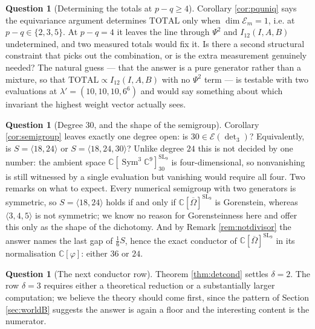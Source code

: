 \documentclass[11pt,reqno]{amsart}
\theoremstyle{plain}
\theoremstyle{definition}
\newtheorem{question}[theorem]{Question}
\DeclareMathOperator{\SL}{SL}
\DeclareMathOperator{\Sym}{Sym}
\newcommand{\cO}{\overline{\Omega}}
\newcommand{\bC}{\mathbb{C}}
\begin{document}
\begin{question}[Determining the totals at $p-q\ge4$]\label{q:gauge}
Corollary \ref{cor:pquniq} says the equivariance argument determines
$\mathrm{TOTAL}$ only when $\dim\mathcal E_m=1$, i.e. at $p-q\in\{2,3,5\}$.  At
$p-q=4$ it leaves the line through $\Psi^{2}$ and $I_{12}(I,A,B)$ undetermined,
and two measured totals would fix it.  Is there a second structural constraint
that picks out the combination, or is the extra measurement genuinely needed?
The natural guess --- that the answer is a pure generator rather than a mixture,
so that $\mathrm{TOTAL}\propto I_{12}(I,A,B)$ with no $\Psi^{2}$ term --- is
testable with two evaluations at $\lambda'=(10,10,10,6^{6})$ and would say
something about which invariant the highest weight vector actually sees.
\end{question}

\begin{question}[Degree $30$, and the shape of the semigroup]\label{q:deg30}
Corollary \ref{cor:semigroup} leaves exactly one degree open: is
$30\in\mathcal E(\det_3)$?  Equivalently, is $S=\langle18,24\rangle$ or
$S=\langle18,24,30\rangle$?  Unlike degree $24$ this is not decided by one
number: the ambient space $\bC[\Sym^3\bC^9]^{\SL_9}_{30}$ is
four-dimensional, so nonvanishing is still witnessed by a single evaluation but
vanishing would require all four.  Two remarks on what to expect.  Every
numerical semigroup with two generators is symmetric, so
$S=\langle18,24\rangle$ holds if and only if $\bC[\cO]^{\SL_9}$ is Gorenstein,
whereas $\langle3,4,5\rangle$ is not symmetric; we know no reason for
Gorensteinness here and offer this only as the shape of the dichotomy.  And by
Remark \ref{rem:notdivisor} the answer names the last gap of $\tfrac16S$, hence
the exact conductor of $\bC[\cO]^{\SL_9}$ in its normalisation $\bC[\varphi]$:
either $36$ or $24$.
\end{question}

\begin{question}[The next conductor row]\label{q:delta3}
Theorem \ref{thm:detcond} settles $\delta=2$.  The row $\delta=3$ requires
either a theoretical reduction or a substantially larger computation; we
believe the theory should come first, since the pattern of Section
\ref{sec:worldB} suggests the answer is again a floor and the interesting
content is the numerator.
\end{question}
\end{document}
